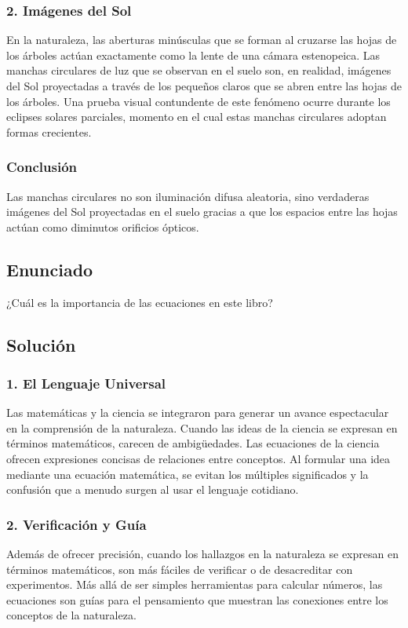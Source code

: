 \documentclass[12pt, a4paper]{article}
\begin{document}
\subsubsection*{2. Imágenes del Sol}
En la naturaleza, las aberturas minúsculas que se forman al cruzarse las hojas de los árboles actúan exactamente como la lente de una cámara estenopeica. Las manchas circulares de luz que se observan en el suelo son, en realidad, imágenes del Sol proyectadas a través de los pequeños claros que se abren entre las hojas de los árboles. Una prueba visual contundente de este fenómeno ocurre durante los eclipses solares parciales, momento en el cual estas manchas circulares adoptan formas crecientes.

\subsubsection*{Conclusión}
Las manchas circulares no son iluminación difusa aleatoria, sino verdaderas imágenes del Sol proyectadas en el suelo gracias a que los espacios entre las hojas actúan como diminutos orificios ópticos.

\newpage

\subsection*{Enunciado}
¿Cuál es la importancia de las ecuaciones en este libro?

\subsection*{Solución}

\subsubsection*{1. El Lenguaje Universal}
Las matemáticas y la ciencia se integraron para generar un avance espectacular en la comprensión de la naturaleza. Cuando las ideas de la ciencia se expresan en términos matemáticos, carecen de ambigüedades. Las ecuaciones de la ciencia ofrecen expresiones concisas de relaciones entre conceptos. Al formular una idea mediante una ecuación matemática, se evitan los múltiples significados y la confusión que a menudo surgen al usar el lenguaje cotidiano.

\subsubsection*{2. Verificación y Guía}
Además de ofrecer precisión, cuando los hallazgos en la naturaleza se expresan en términos matemáticos, son más fáciles de verificar o de desacreditar con experimentos. Más allá de ser simples herramientas para calcular números, las ecuaciones son guías para el pensamiento que muestran las conexiones entre los conceptos de la naturaleza.
\end{document}
